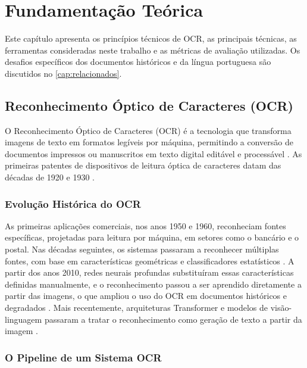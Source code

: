 \documentclass[noabntexcite,oneside]{ufsc-thesis-rn46-2019}
\begin{document}
\chapter{Fundamentação Teórica}
\label{cap:fundamentacao}

Este capítulo apresenta os princípios técnicos de OCR, as principais técnicas, as
ferramentas consideradas neste trabalho e as métricas de avaliação utilizadas. Os desafios
específicos dos documentos históricos e da língua portuguesa são discutidos no
\autoref{cap:relacionados}.

\section{Reconhecimento Óptico de Caracteres (OCR)}

O Reconhecimento Óptico de Caracteres (OCR) é a tecnologia que transforma imagens de
texto em formatos legíveis por máquina, permitindo a conversão de documentos impressos
ou manuscritos em texto digital editável e processável \cite{mori1992}. As primeiras
patentes de dispositivos de leitura óptica de caracteres datam das décadas de 1920 e 1930
\cite{mori1992}.

\subsection{Evolução Histórica do OCR}

As primeiras aplicações comerciais, nos anos 1950 e 1960, reconheciam fontes
específicas, projetadas para leitura por máquina, em setores como o bancário e o postal.
Nas décadas seguintes, os sistemas passaram a reconhecer múltiplas fontes, com base em
características geométricas e classificadores estatísticos \cite{mori1992}. A partir dos
anos 2010, redes neurais profundas substituíram essas características definidas
manualmente, e o reconhecimento passou a ser aprendido diretamente a partir das imagens,
o que ampliou o uso do OCR em documentos históricos e degradados \cite{lombardi2020}.
Mais recentemente, arquiteturas Transformer e modelos de visão-linguagem passaram a
tratar o reconhecimento como geração de texto a partir da imagem
\cite{huang2021,qwen2025vl}.

\subsection{O Pipeline de um Sistema OCR}
\end{document}
